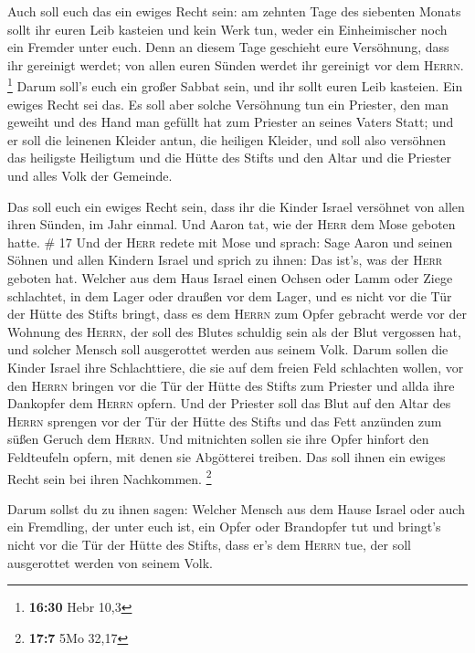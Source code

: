  Auch soll euch das ein ewiges Recht sein: am zehnten
Tage des siebenten Monats sollt ihr euren Leib kasteien und kein Werk
tun, weder ein Einheimischer noch ein Fremder unter euch.
 Denn an diesem Tage geschieht eure Versöhnung, dass ihr
gereinigt werdet; von allen euren Sünden werdet ihr gereinigt vor dem
\textsc{Herrn}. \footnote{\textbf{16:30} Hebr 10,3} 
Darum soll's euch ein großer Sabbat sein, und ihr sollt euren Leib
kasteien. Ein ewiges Recht sei das.  Es soll aber solche
Versöhnung tun ein Priester, den man geweiht und des Hand man gefüllt
hat zum Priester an seines Vaters Statt; und er soll die leinenen
Kleider antun, die heiligen Kleider,  und soll also
versöhnen das heiligste Heiligtum und die Hütte des Stifts und den Altar
und die Priester und alles Volk der Gemeinde.

 Das soll euch ein ewiges Recht sein, dass ihr die Kinder
Israel versöhnet von allen ihren Sünden, im Jahr einmal. Und Aaron tat,
wie der \textsc{Herr} dem Mose geboten hatte. \# 17  Und
der \textsc{Herr} redete mit Mose und sprach:  Sage Aaron
und seinen Söhnen und allen Kindern Israel und sprich zu ihnen: Das
ist's, was der \textsc{Herr} geboten hat.  Welcher aus dem
Haus Israel einen Ochsen oder Lamm oder Ziege schlachtet, in dem Lager
oder draußen vor dem Lager,  und es nicht vor die Tür der
Hütte des Stifts bringt, dass es dem \textsc{Herrn} zum Opfer gebracht
werde vor der Wohnung des \textsc{Herrn}, der soll des Blutes schuldig
sein als der Blut vergossen hat, und solcher Mensch soll ausgerottet
werden aus seinem Volk.  Darum sollen die Kinder Israel
ihre Schlachttiere, die sie auf dem freien Feld schlachten wollen, vor
den \textsc{Herrn} bringen vor die Tür der Hütte des Stifts zum Priester
und allda ihre Dankopfer dem \textsc{Herrn} opfern.  Und
der Priester soll das Blut auf den Altar des \textsc{Herrn} sprengen vor
der Tür der Hütte des Stifts und das Fett anzünden zum süßen Geruch dem
\textsc{Herrn}.  Und mitnichten sollen sie ihre Opfer
hinfort den Feldteufeln opfern, mit denen sie Abgötterei treiben. Das
soll ihnen ein ewiges Recht sein bei ihren Nachkommen. \footnote{\textbf{17:7}
  5Mo 32,17}

 Darum sollst du zu ihnen sagen: Welcher Mensch aus dem
Hause Israel oder auch ein Fremdling, der unter euch ist, ein Opfer oder
Brandopfer tut  und bringt's nicht vor die Tür der Hütte
des Stifts, dass er's dem \textsc{Herrn} tue, der soll ausgerottet
werden von seinem Volk.

